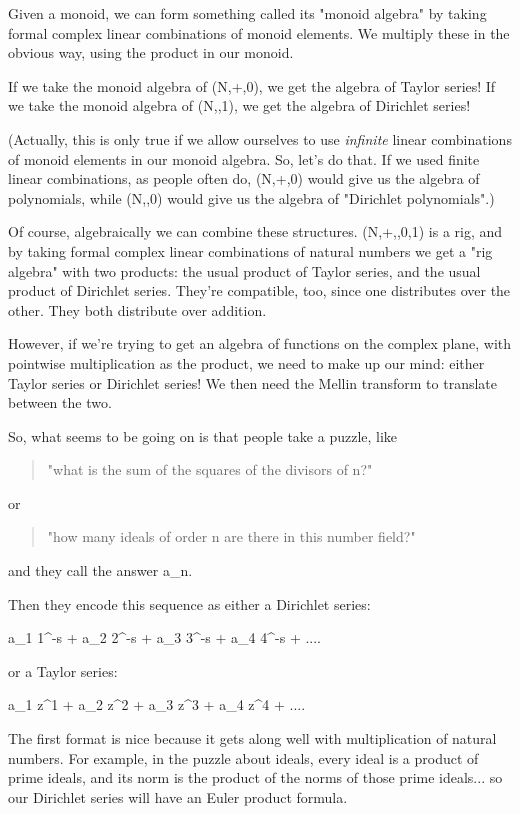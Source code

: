 Given a monoid, we can form something called its "monoid algebra" by taking 
formal complex linear combinations of monoid elements.  We multiply these 
in the obvious way, using the product in our monoid.

If we take the monoid algebra of (N,+,0), we get the algebra of Taylor 
series!  If we take the monoid algebra of (N,\times ,1), we get the algebra of 
Dirichlet series!  

(Actually, this is only true if we allow ourselves to use \emph{infinite} 
linear 
combinations of monoid elements in our monoid algebra.  So, let's do that.  
If we used finite linear combinations, as people often do, (N,+,0) would give 
us the algebra of polynomials, while (N,\times ,0) would give us the algebra of 
"Dirichlet polynomials".)

Of course, algebraically we can combine these structures.  (N,+,\times ,0,1) is 
a rig, and by taking formal complex linear combinations of natural numbers 
we get a "rig algebra" with two products: the usual product of Taylor series, 
and the usual product of Dirichlet series.  They're compatible, too, since 
one distributes over the other.  They both distribute over addition.

However, if we're trying to get an algebra of functions on the complex plane, 
with pointwise multiplication as the product, we need to make up our mind: 
either Taylor series or Dirichlet series!  We then need the Mellin transform 
to translate between the two.

So, what seems to be going on is that people take a puzzle, like 

\begin{quote}
"what is the sum of the squares of the divisors of n?"
\end{quote}

or 
\begin{quote}
"how many ideals of order n are there in this number field?"
\end{quote}

and they call the answer a_{n}.  

Then they encode this sequence as either a Dirichlet series:

a_{1} 1^{-s} + a_{2} 2^{-s} + a_{3} 3^{-s} + a_{4} 4^{-s} + ....

or a Taylor series:

a_{1} z^{1} + a_{2} z^{2} + a_{3} z^{3} + a_{4} z^{4} + ....

The first format is nice because it gets along well with multiplication of 
natural numbers.  For example, in the puzzle about ideals,
every ideal is a product of prime ideals, and its norm is 
the product of the norms of those prime ideals... so our Dirichlet series 
will have an Euler product formula.

